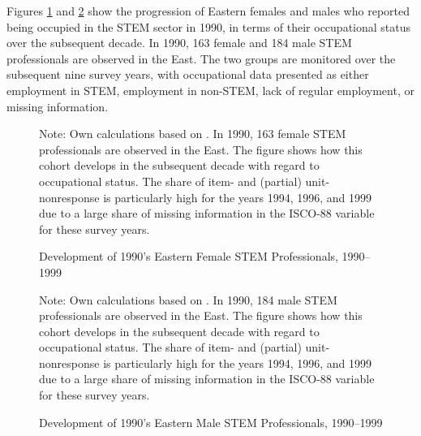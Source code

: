 \documentclass[a4paper, oneside, hyperfootnotes = false]{article}
\begin{document}
{Figures \ref{fig:survivalfemale} and \ref{fig:survivalmale} show the progression of Eastern females and males who reported being occupied in the STEM sector in 1990, in terms of their occupational status over the subsequent decade.
In 1990, 163 female and 184 male STEM professionals are observed in the East.
The two groups are monitored over the subsequent nine survey years, with occupational data presented as either employment in STEM, employment in non-STEM, lack of regular employment, or missing information.

\begin{figure}[ht]
	\centering
	\caption{Development of 1990's Eastern Female STEM Professionals, 1990--1999}
	\label{fig:survivalfemale}
	\fontsize{9pt}{11pt}\selectfont
	\def\svgwidth{.9\textwidth}
	
	\vspace{2mm}
	\parbox{10cm}{
		\linespread{1}\footnotesize Note: Own calculations based on \cite{SOEP2023}. In 1990, 163 female STEM professionals are observed in the East. The figure shows how this cohort develops in the subsequent decade with regard to occupational status. The share of item- and (partial) unit-nonresponse is particularly high for the years 1994, 1996, and 1999 due to a large share of missing information in the ISCO-88 variable for these survey years.}
\end{figure}

\begin{figure}[ht]
	\centering
	\caption{Development of 1990's Eastern Male STEM Professionals, 1990--1999}
	\label{fig:survivalmale}
	\fontsize{9pt}{11pt}\selectfont
	\def\svgwidth{.9\textwidth}
	
	\vspace{2mm}
	\parbox{10cm}{
		\linespread{1}\footnotesize Note: Own calculations based on \cite{SOEP2023}. In 1990, 184 male STEM professionals are observed in the East. The figure shows how this cohort develops in the subsequent decade with regard to occupational status. The share of item- and (partial) unit-nonresponse is particularly high for the years 1994, 1996, and 1999 due to a large share of missing information in the ISCO-88 variable for these survey years.}
\end{figure}

}
\end{document}
